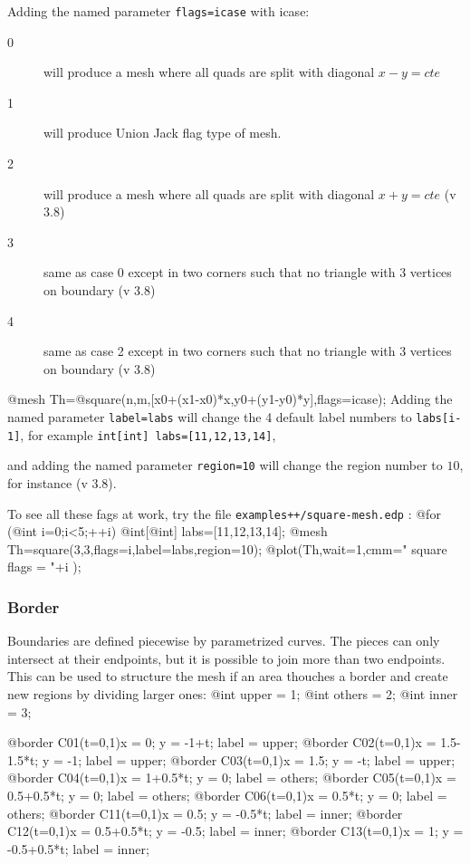 \documentclass[a4paper,twoside,12pt]{book}
\def\setS#1{#1\label{sec:#1}}
\begin{document}
\begin{note}
Adding the  named  parameter \texttt{flags=icase} with icase:
\begin{description}
\item[0] will produce a mesh where all quads are split with diagonal $ x-y=cte$
\item[1] will produce Union Jack flag type of mesh.
\item[2] will produce a mesh where all quads are split with diagonal $ x+y=cte$ (v 3.8)
\item[3] same as case 0  except in two corners such that no triangle with 3 vertices on boundary (v 3.8)
\item[4] same as case 2  except in two corners such that no triangle with 3 vertices on boundary (v 3.8)
\end{description}
\bFF
  @mesh Th=@square(n,m,[x0+(x1-x0)*x,y0+(y1-y0)*y],flags=icase);
\eFF
Adding the  named  parameter \texttt{label=labs} will change the 4 default
label numbers to \texttt{labs[i-1]}, for example \texttt{int[int] labs=[11,12,13,14]},

and adding the  named parameter \texttt{region=10} will change  the region number  to $10$,  for instance (v 3.8).

To see all these fags at work,  try the file \texttt{examples++/square-mesh.edp} :
\bFF
@for (@int i=0;i<5;++i)
  {
    @int[@int] labs=[11,12,13,14];
    @mesh Th=square(3,3,flags=i,label=labs,region=10);
    @plot(Th,wait=1,cmm=" square flags = "+i );
   }
\eFF

\end{note}


\subsubsection{\setS{Border}}

Boundaries are defined piecewise by parametrized curves.
The pieces can only intersect at their endpoints, but it is possible to 
join more than two endpoints. This can be used to structure the mesh
if an area thouches a border and create new regions by dividing larger ones:
\bFF
@int upper = 1;
@int others = 2;
@int inner = 3;

@border C01(t=0,1){x = 0;         y = -1+t;        label = upper;}
@border C02(t=0,1){x = 1.5-1.5*t; y = -1;          label = upper;}
@border C03(t=0,1){x = 1.5;       y = -t;          label = upper;}
@border C04(t=0,1){x = 1+0.5*t;   y = 0;           label = others;}
@border C05(t=0,1){x = 0.5+0.5*t; y = 0;           label = others;}
@border C06(t=0,1){x = 0.5*t;     y = 0;           label = others;}
@border C11(t=0,1){x = 0.5;       y = -0.5*t;      label = inner;}
@border C12(t=0,1){x = 0.5+0.5*t; y = -0.5;        label = inner;}
@border C13(t=0,1){x = 1;         y = -0.5+0.5*t;  label = inner;}
\end{document}
